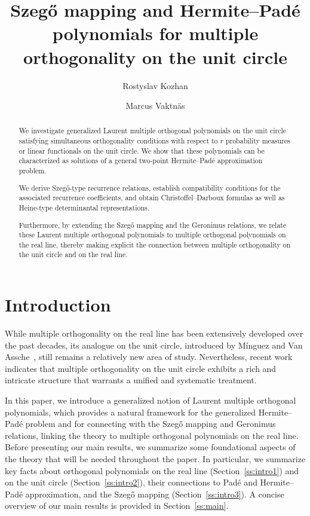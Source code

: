 \documentclass[reqno,centertags,11pt,draft]{amsart}
\title[Multiple orthogonality on the unit circle]{Szeg\H{o} mapping and Hermite--Pad\'{e} polynomials for multiple orthogonality on the unit circle}
\author{Rostyslav Kozhan}
\author{Marcus Vaktn\"as}
\begin{document}
\begin{abstract}
We investigate generalized Laurent multiple orthogonal polynomials on the unit circle satisfying simultaneous orthogonality conditions with respect to $r$ probability measures or linear functionals on the unit circle. We show that these polynomials can be characterized as solutions of a general two-point Hermite--Pad\'e approximation problem.

We derive Szeg\H{o}-type recurrence relations, establish compatibility conditions for the associated recurrence coefficients, and obtain Christoffel--Darboux formulas as well as Heine-type determinantal representations.

Furthermore, by extending the Szeg\H{o} mapping and the Geronimus relations, we relate these Laurent multiple orthogonal polynomials to multiple orthogonal polynomials on the real line, thereby making explicit the connection between multiple orthogonality on the unit circle and on the real line.
\end{abstract}
\maketitle

\section{Introduction}

While multiple orthogonality on the real line has been extensively developed over the past decades, its analogue on the unit circle, introduced by M\'{i}nguez and Van Assche~\cite{MOPUC1}, still remains a relatively new area of study. Nevertheless, recent work~\cite{MOPUC2,KVMOPUC,KVMLOPUC1,KNik,HueMan} indicates that multiple orthogonality on the unit circle exhibits a rich and intricate structure that warrants a unified and systematic treatment.

In this paper, we introduce a generalized notion of Laurent multiple orthogonal polynomials, which provides a natural framework for the generalized Hermite--Pad\'{e} problem and for connecting with the Szeg\H{o} mapping and Geronimus relations, linking the theory to multiple orthogonal polynomials on the real line. Before presenting our main results, we summarize some foundational aspects of the theory that will be needed throughout the paper. In particular, we summarize key facts about orthogonal polynomials on the real line (Section~\ref{ss:intro1}) and on the unit circle  (Section~\ref{ss:intro2}), their connections to Pad\'e and Hermite--Pad\'e approximation, and the Szeg\H{o} mapping  (Section~\ref{ss:intro3}). A concise overview of our main results is provided in Section~\ref{ss:main}.
\end{document}
